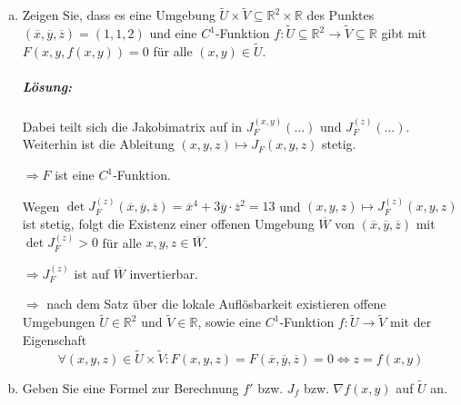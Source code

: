 \documentclass{scrreprt}
\begin{document}
\begin{enumerate}[a)]
\item Zeigen Sie, dass es eine Umgebung
  $\tilde{U} \times \tilde{V} \subseteq \mathbb{R}^2 \times \mathbb{R}$
  des Punktes $(\overline{x}, \overline{y}, \overline{z}) = (1, 1, 2)$
  und eine $C^1$-Funktion
  $f \colon \tilde{U} \subseteq \mathbb{R}^2 \to \tilde{V} \subseteq \mathbb{R}$
  gibt mit $F(x, y, f(x, y)) = 0$ für alle $(x, y) \in \tilde{U}$.

  \subparagraph{Lösung:}
  Dabei teilt sich die Jakobimatrix auf in
  \colorbox{red!40}{$J_F^{(x,y)} (\ldots)$} und
  \colorbox{blue!40}{$J_F^{(z)} (\ldots)$}.
  Weiterhin ist die Ableitung $(x, y, z) \mapsto J_F(x, y, z)$ stetig.

  $\Rightarrow F$ ist eine $C^1$-Funktion.

  Wegen
  $\det J_F^{(z)}(\overline{x}, \overline{y}, \overline{z}) =
  \overline{x}^4 + 3\overline{y} \cdot \overline{z}^2 = 13$ und
  $(x, y, z) \mapsto J_F^{(z)}(x, y, z)$ ist stetig, folgt die
  Existenz einer offenen Umgebung $\overline{W}$ von
  $(\overline{x}, \overline{y}, \overline{z})$ mit
  $\det J_F^{(z)} > 0$ für alle $x, y, z \in \overline{W}$.

  $\Rightarrow J_F^{(z)}$ ist auf $\overline{W}$ invertierbar.

  $\Rightarrow$ nach dem Satz über die lokale Auflösbarkeit existieren
  offene Umgebungen $\tilde{U} \in \mathbb{R}^2$ und $\tilde{V} \in \mathbb{R}$,
  sowie eine $C^1$-Funktion $f \colon \tilde{U} \to \tilde{V}$
  mit der Eigenschaft
  \[
    \forall (x, y, z) \in \tilde{U} \times \tilde{V} \colon
    F(x, y, z) = F(\overline{x}, \overline{y}, \overline{z}) = 0
    \iff z = f(x, y)
  \]

\item Geben Sie eine Formel zur Berechnung $f'$ bzw. $J_f$ bzw.
  $\nabla f(x, y)$ auf $\tilde{U}$ an.


\end{enumerate}
\end{document}
